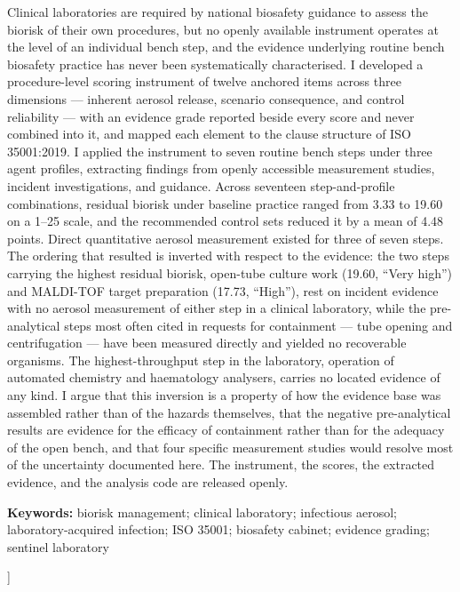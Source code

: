 \begin{@twocolumnfalse}
\noindent\hspace{0.055\textwidth}\begin{minipage}{0.89\textwidth}
\small
\noindent Clinical laboratories are required by national biosafety guidance to assess
the biorisk of their own procedures, but no openly available instrument operates at the
level of an individual bench step, and the evidence underlying routine bench biosafety
practice has never been systematically characterised. I developed a procedure-level
scoring instrument of twelve anchored items across three dimensions --- inherent aerosol
release, scenario consequence, and control reliability --- with an evidence grade reported
beside every score and never combined into it, and mapped each element to the clause
structure of ISO 35001:2019. I applied the instrument to seven routine bench steps under
three agent profiles, extracting findings from openly accessible measurement studies,
incident investigations, and guidance. Across seventeen step-and-profile combinations,
residual biorisk under baseline practice ranged from 3.33 to 19.60 on a 1--25 scale, and
the recommended control sets reduced it by a mean of 4.48 points. Direct quantitative
aerosol measurement existed for three of seven steps. The ordering that resulted is
inverted with respect to the evidence: the two steps carrying the highest residual
biorisk, open-tube culture work (19.60, ``Very high'') and MALDI-TOF target preparation
(17.73, ``High''), rest on incident evidence with no aerosol measurement of either step in
a clinical laboratory, while the pre-analytical steps most often cited in requests for
containment --- tube opening and centrifugation --- have been measured directly and
yielded no recoverable organisms. The highest-throughput step in the laboratory, operation
of automated chemistry and haematology analysers, carries no located evidence of any kind.
I argue that this inversion is a property of how the evidence base was assembled rather
than of the hazards themselves, that the negative pre-analytical results are evidence for
the efficacy of containment rather than for the adequacy of the open bench, and that four
specific measurement studies would resolve most of the uncertainty documented here. The
instrument, the scores, the extracted evidence, and the analysis code are released openly.

\vspace{2.5mm}
\noindent\textbf{Keywords:} biorisk management; clinical laboratory; infectious aerosol;
laboratory-acquired infection; ISO 35001; biosafety cabinet; evidence grading; sentinel
laboratory
\end{minipage}

\vspace{7mm}
\end{@twocolumnfalse}
]
\thispagestyle{titlestyle}


